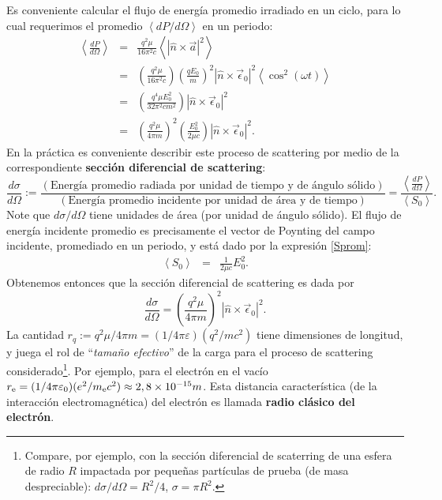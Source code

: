 Es conveniente calcular el flujo de energía promedio irradiado en un ciclo,
para lo cual requerimos el promedio $\left\langle
{dP}/{d\Omega}\right\rangle$ en un periodo:
\begin{eqnarray}
\left\langle\frac{dP}{d\Omega}\right\rangle  &=&
\frac{q^2\mu}{16\pi^2 c}\left\langle |\hat{n}\times\vec{a}|^2\right\rangle \\
&=&\left(\frac{q^2\mu}{16\pi^2 c}\right)\left(\frac{qE_0}{m}\right)^2\left|
\hat{n}\times\vec{\epsilon}_0\right|^2\left\langle
\cos^2(\omega t)\right\rangle \\
&=&\left(\frac{q^4\mu E_0^2}{32\pi^2 c m^2}\right)\left|
\hat{n}\times\vec{\epsilon}_0\right|^2\\
&=&\left(\frac{q^2\mu}{4\pi m}\right)^2\left(\frac{E_0^2}{2\mu c}\right) \left|
\hat{n}\times\vec{\epsilon}_0\right|^2.
\end{eqnarray}
En la práctica es conveniente describir este proceso de scattering por medio de
la correspondiente  \textbf{sección diferencial de scattering}:
\begin{equation}
\frac{d\sigma}{d\Omega}:=\frac{\left( \text{Energía promedio radiada por unidad
de tiempo y de ángulo sólido}\right) }{\left( \text{Energía promedio
incidente por unidad de área y de tiempo}\right) }=\frac{\left\langle
\frac{dP}{d\Omega}\right\rangle}{\left\langle S_0\right\rangle}.
\end{equation}
Note que ${d\sigma}/{d\Omega}$ tiene unidades de área (por unidad de ángulo
sólido).
El flujo de energía incidente promedio es precisamente el vector de Poynting
del campo incidente, promediado en un periodo, y está dado por la expresión \eqref{Sprom}:
\begin{eqnarray}
\left\langle S_0\right\rangle &=&\frac{1}{2\mu c}E_0^2.
\end{eqnarray}
Obtenemos entonces que la sección diferencial de scattering es dada por
\begin{equation}
\boxed{\frac{d\sigma}{d\Omega}  =\left(\frac{q^2\mu}{4\pi m}\right)^2\left|
\hat{n}\times\vec{\epsilon}_0\right|^2 .}\label{seeT}
\end{equation}
La cantidad $r_q:={q^2\mu}/{4\pi m}=(1/{4\pi\varepsilon})({q^2}/{mc^2})$ tiene dimensiones de longitud, y juega el rol de ``\textit{tamaño efectivo}'' de la carga para el proceso de scattering considerado\footnote{Compare, por ejemplo, con la sección diferencial de scaterring de una esfera de radio $R$ impactada por pequeñas partículas de prueba (de masa despreciable): $d\sigma/d\Omega=R^2/4$, $\sigma=\pi R^2$.}. Por ejemplo, para el electrón en el vacío $r_{\rm e}=(1/{4\pi\varepsilon_0})({e^2}/{m_{\rm e}c^2})\approx 2,8\times 10^{-15}m$. Esta distancia característica (de la interacción electromagnética) del electrón es llamada \textbf{radio clásico del electrón}.

